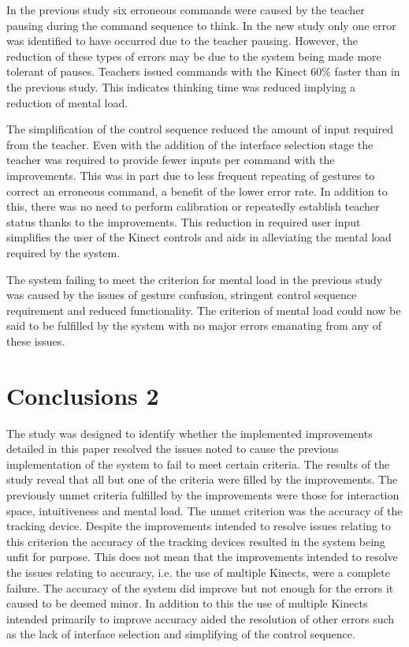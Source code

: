 \documentclass[manuscript, review, screen]{acmart}
\begin{document}
In the previous study six erroneous commands were caused by the teacher pausing during the command sequence to think.
In the new study only one error was identified to have occurred due to the teacher pausing.
However, the reduction of these types of errors may be due to the system being made more tolerant of pauses.
Teachers issued commands with the Kinect 60\% faster than in the previous study.
This indicates thinking time was reduced implying a reduction of mental load.

The simplification of the control sequence reduced the amount of input required from the teacher.
Even with the addition of the interface selection stage the teacher was required to provide fewer inputs per command with the improvements.
This was in part due to less frequent repeating of gestures to correct an erroneous command, a benefit of the lower error rate.
In addition to this, there was no need to perform calibration or repeatedly establish teacher status thanks to the improvements.
This reduction in required user input simplifies the user of the Kinect controls and aids in alleviating the mental load required by the system.

The system failing to meet the criterion for mental load in the previous study was caused by the issues of gesture confusion, stringent control sequence requirement and reduced functionality.
The criterion of mental load could now be said to be fulfilled by the system with no major errors emanating from any of these issues.


\section{Conclusions 2}
\label{sec:conclusion2}



The study was designed to identify whether the implemented improvements detailed in this paper resolved the issues noted to cause the previous implementation of the system to fail to meet certain criteria.
The results of the study reveal that all but one of the criteria were filled by the improvements.
The previously unmet criteria fulfilled by the improvements were those for interaction space, intuitiveness and mental load.
The unmet criterion was the accuracy of the tracking device.
Despite the improvements intended to resolve issues relating to this criterion the accuracy of the tracking devices resulted in the system being unfit for purpose.
This does not mean that the improvements intended to resolve the issues relating to accuracy, i.e. the use of multiple Kinects, were a complete failure.
The accuracy of the system did improve but not enough for the errors it caused to be deemed minor.
In addition to this the use of multiple Kinects intended primarily to improve accuracy aided the resolution of other errors such as the lack of interface selection and simplifying of the control sequence.
\end{document}
